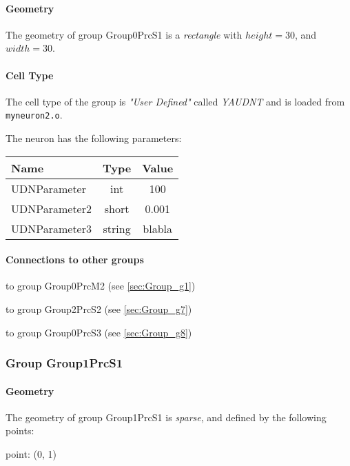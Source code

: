 \documentclass[a4paper, 11pt]{article}
\begin{document}
\paragraph*{Geometry}

The geometry of group Group0PrcS1 is a \emph{rectangle} with
$height= 30$, and $width= 30$.

\paragraph*{Cell Type}
The cell type of the group is \emph{"User Defined"} called \emph{YAUDNT} 
and is loaded from \verb!myneuron2.o!.


The neuron has the following parameters:

\begin{center}
\begin{tabular}{l|c|c}
Name & Type & Value\\\hline
UDNParameter & int & 100\\
UDNParameter2 & short & 0.001\\
UDNParameter3 & string & blabla\\
\end{tabular}
\end{center}

\paragraph*{Connections to other groups}
\begin{compactenum}
\item to group Group0PrcM2 (see \ref{sec:Group_g1})
\item to group Group2PrcS2 (see \ref{sec:Group_g7})
\item to group Group0PrcS3 (see \ref{sec:Group_g8})
\end{compactenum}

\subsubsection{Group Group1PrcS1}
\label{sec:Group_g4}

\paragraph*{Geometry}

The geometry of group Group1PrcS1 is \emph{sparse}, and defined
by the following points:
\begin{compactitem}
   \item point: (0, 1)
\end{compactitem}
\end{document}
